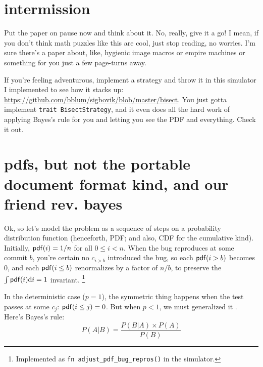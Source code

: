 \documentclass[11pt]{sigplanconf}
\begin{document}

\section{intermission}

Put the paper on pause now and think about it.
No, really, give it a go!
I mean, if you don't think math puzzles like this are cool, just stop reading, no worries.
I'm sure there's a paper about, like, hygienic image macros or empire machines or something for you just a few page-turns away.

If you're feeling adventurous,
implement a strategy and throw it in this simulator I implemented to see how it stacks up:
\url{https://github.com/bblum/sigbovik/blob/master/bisect}.
You just gotta implement {\tt trait BisectStrategy},
and it even does all the hard work of applying Bayes's rule
for you and letting you see the PDF and everything.
Check it out.



\section{pdfs, but not the portable document format kind, and our friend rev. bayes}

Ok, so let's model the problem as a sequence of steps on a probability distribution function
(henceforth, PDF; and also, CDF for the cumulative kind).
Initially, $\mathsf{pdf}(i) = 1/n$ for all $0 \le i < n$.
When the bug reproduces at some commit $b$,
you're certain no $c_{i>b}$ introduced the bug, so each $\mathsf{pdf}(i>b)$ becomes $0$,
and each $\mathsf{pdf}(i\le b)$ renormalizes by a factor of $n/b$, to preserve the $\int \mathsf{pdf}(i) \text{d} i = 1$ invariant.%
\footnote{Implemented as {\tt fn adjust\_pdf\_bug\_repros()} in the simulator.}

In the deterministic case ($p=1$),
the symmetric thing happens when the test passes at some $c_j$: $\mathsf{pdf}(i\le j) = 0$.
But when $p<1$, we must generalized it \cite{mario3}. Here's Bayes's rule:
\[
P(A|B) = \frac{P(B|A) \times P(A)}{P(B)}
\]

\newcommand\renorm[1]{\ensuremath{\mathcal{R}_{#1}}\xspace}
\end{document}
